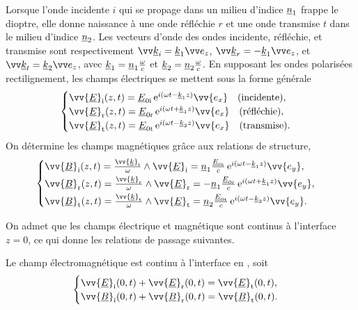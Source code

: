 \documentclass[12pt,fancy]{cours}%
\begin{document}
Lorsque l'onde incidente $i$ qui se propage dans un milieu d'indice $\underline{n}_1$ frappe le dioptre, elle donne naissance à une onde réfléchie $r$ et une onde transmise $t$ dans le milieu d'indice $\underline{n}_2$. Les vecteurs d'onde des ondes incidente, réfléchie, et transmise sont respectivement $\Vec{\udl{k}}_i = \udl{k}_1 \ez$, $\Vec{\udl{k}}_r = -\udl{k}_1 \ez$, et $\Vec{\udl{k}_t} = \udl{k}_2 \ez$, avec $\underline{k}_1 = \underline{n}_1 \frac{\omega}{c}$ et $\underline{k}_2 = \underline{n}_2 \frac{\omega}{c}$.
En supposant les ondes polarisées rectilignement, les champs électriques se mettent sous la forme générale
\begin{equation}
\begin{cases}
\vv{\udl{E}}_{\rm{i}}(z,t)=\udl{E}_{0\rm{i}}\,\e^{i(\omega t-\udl{k}_1 z)}\vv{e_x} \quad \text{(incidente)},\\
\vv{\udl{E}}_{\rm{r}}(z,t)=\udl{E}_{0\rm{r}}\,\e^{i(\omega t+\udl{k}_1 z)}\vv{e_x}\quad \text{(réfléchie)}, \\
\vv{\udl{E}}_{\rm{t}}(z,t)=\udl{E}_{0\rm{t}}\,\e^{i(\omega t-\udl{k}_2 z)}\vv{e_x} \quad \text{(transmise)}.
\end{cases}
\end{equation}
On détermine les champs magnétiques grâce aux relations de structure,
\begin{equation}
\begin{cases}
\vv{\udl{B}}_{\rm{i}}(z,t)=\frac{\vv{\udl{k}}_{\rm{i}}}{\omega} \pv\vv{\udl{E}}_{\rm{i}} =\udl{n}_1\frac{\udl{E}_{0\rm{i}}}{c}\,\e^{i(\omega t-\udl{k}_1 z)}\vv{e_y}, \\[1mm]
\vv{\udl{B}}_{\rm{r}}(z,t)=\frac{\vv{\udl{k}}_{\rm{r}}}{\omega} \pv\vv{\udl{E}}_{\rm{r}}=-\udl{n}_1\frac{ \udl{E}_{0\rm{r}}}{c}\,\e^{i(\omega t+\udl{k}_1 z)}\vv{e_y}, \\[1mm]
\vv{\udl{B}}_{\rm{t}}(z,t)=\frac{\vv{\udl{k}}_{\rm{t}}}{\omega} \pv\vv{\udl{E}}_{\rm{t}}=\udl{n}_2 \frac{\udl{E}_{0\rm{t}}}{c}\,\e^{i(\omega t-\udl{k}_2 z)}\vv{e_y}.
\end{cases}
\end{equation}

On admet que les champs électrique et magnétique  sont continus à l'interface $z=0$, ce qui donne les relations de passage suivantes.

\begin{prop}\label{prop:}
  Le champ électromagnétique est continu à l'interface en , soit
  $$
    \begin{cases}
      \vv{\udl{E}}_{\rm{i}}(0,t)+\vv{\udl{E}}_{\rm{r}}(0,t)=\vv{\udl{E}}_{\rm{t}}(0,t),\\
      \vv{\udl{B}}_{\rm{i}}(0,t)+\vv{\udl{B}}_{\rm{r}}(0,t)=\vv{\udl{B}}_{\rm{t}}(0,t).
    \end{cases}
    $$
\end{prop}
\end{document}

